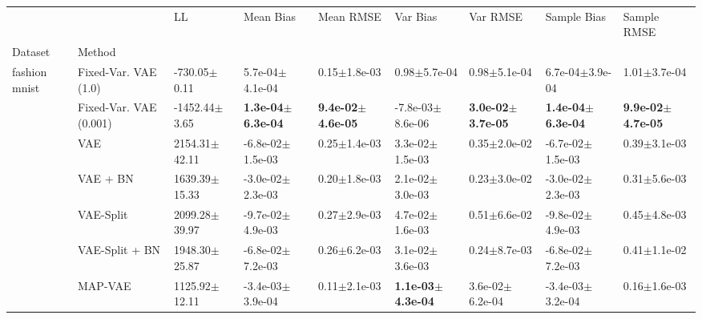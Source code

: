 \begin{tabular}{lllllllll}
\toprule
             &     &                          LL &                      Mean Bias &                     Mean RMSE &                       Var Bias &                      Var RMSE &                   Sample Bias &                   Sample RMSE \\
Dataset & Method &                             &                                &                               &                                &                               &                               &                               \\
\midrule
fashion mnist & Fixed-Var. VAE (1.0) &            -730.05$\pm$0.11 &            5.7e-04$\pm$4.1e-04 &              0.15$\pm$1.8e-03 &               0.98$\pm$5.7e-04 &              0.98$\pm$5.1e-04 &           6.7e-04$\pm$3.9e-04 &              1.01$\pm$3.7e-04 \\
             & Fixed-Var. VAE (0.001) &           -1452.44$\pm$3.65 &   \textbf{1.3e-04$\pm$6.3e-04} &  \textbf{9.4e-02$\pm$4.6e-05} &           -7.8e-03$\pm$8.6e-06 &  \textbf{3.0e-02$\pm$3.7e-05} &  \textbf{1.4e-04$\pm$6.3e-04} &  \textbf{9.9e-02$\pm$4.7e-05} \\
             & VAE &           2154.31$\pm$42.11 &           -6.8e-02$\pm$1.5e-03 &              0.25$\pm$1.4e-03 &            3.3e-02$\pm$1.5e-03 &              0.35$\pm$2.0e-02 &          -6.7e-02$\pm$1.5e-03 &              0.39$\pm$3.1e-03 \\
             & VAE + BN &           1639.39$\pm$15.33 &           -3.0e-02$\pm$2.3e-03 &              0.20$\pm$1.8e-03 &            2.1e-02$\pm$3.0e-03 &              0.23$\pm$3.0e-02 &          -3.0e-02$\pm$2.3e-03 &              0.31$\pm$5.6e-03 \\
             & VAE-Split &           2099.28$\pm$39.97 &           -9.7e-02$\pm$4.9e-03 &              0.27$\pm$2.9e-03 &            4.7e-02$\pm$1.6e-03 &              0.51$\pm$6.6e-02 &          -9.8e-02$\pm$4.9e-03 &              0.45$\pm$4.8e-03 \\
             & VAE-Split + BN &           1948.30$\pm$25.87 &           -6.8e-02$\pm$7.2e-03 &              0.26$\pm$6.2e-03 &            3.1e-02$\pm$3.6e-03 &              0.24$\pm$8.7e-03 &          -6.8e-02$\pm$7.2e-03 &              0.41$\pm$1.1e-02 \\
             & MAP-VAE &           1125.92$\pm$12.11 &           -3.4e-03$\pm$3.9e-04 &              0.11$\pm$2.1e-03 &   \textbf{1.1e-03$\pm$4.3e-04} &           3.6e-02$\pm$6.2e-04 &          -3.4e-03$\pm$3.2e-04 &              0.16$\pm$1.6e-03 \\

\end{tabular}
